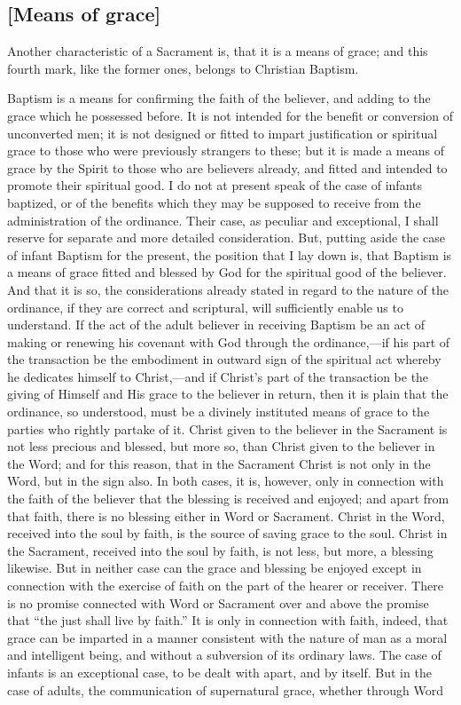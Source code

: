 \documentclass[
  english,
]{book}
\begin{document}
\hypertarget{means-of-grace-1}{%
\subsection{{[}Means of grace{]}}\label{means-of-grace-1}}

Another characteristic of a Sacrament is, that it is a means of grace; and this fourth mark, like the former ones, belongs to Christian Baptism.

Baptism is a means for confirming the faith of the believer, and adding to the grace which he possessed before. It is not intended for the benefit or conversion of unconverted men; it is not designed or fitted to impart justification or spiritual grace to those who were previously strangers to these; but it is made a means of grace by the Spirit to those who are believers already, and fitted and intended to promote their spiritual good. I do not at present speak of the case of infants baptized, or of the benefits which they may be supposed to receive from the administration of the ordinance. Their case, as peculiar and exceptional, I shall reserve for separate and more detailed consideration. But, putting aside the case of infant Baptism for the present, the position that I lay down is, that Baptism is a means of grace fitted and blessed by God for the spiritual good of the believer. And that it is so, the considerations already stated in regard to the nature of the ordinance, if they are correct and scriptural, will sufficiently enable us to understand. If the act of the adult believer in receiving Baptism be an act of making or renewing his covenant with God through the ordinance,---if his part of the transaction be the embodiment in outward sign of the spiritual act whereby he dedicates himself to Christ,---and if Christ's part of the transaction be the giving of Himself and His grace to the believer in return, then it is plain that the ordinance, so understood, must be a divinely instituted means of grace to the parties who rightly partake of it. Christ given to the believer in the Sacrament is not less precious and blessed, but more so, than Christ given to the believer in the Word; and for this reason, that in the Sacrament Christ is not only in the Word, but in the sign also. In both cases, it is, however, only in connection with the faith of the believer that the blessing is received and enjoyed; and apart from that faith, there is no blessing either in Word or Sacrament. Christ in the Word, received into the soul by faith, is the source of saving grace to the soul. Christ in the Sacrament, received into the soul by faith, is not less, but more, a blessing likewise. But in neither case can the grace and blessing be enjoyed except in connection with the exercise of faith on the part of the hearer or receiver. There is no promise connected with Word or Sacrament over and above the promise that ``the just shall live by faith.'' It is only in connection with faith, indeed, that grace can be imparted in a manner consistent with the nature of man as a moral and intelligent being, and without a subversion of its ordinary laws. The case of infants is an exceptional case, to be dealt with apart, and by itself. But in the case of adults, the communication of supernatural grace, whether through Word 
\end{document}
